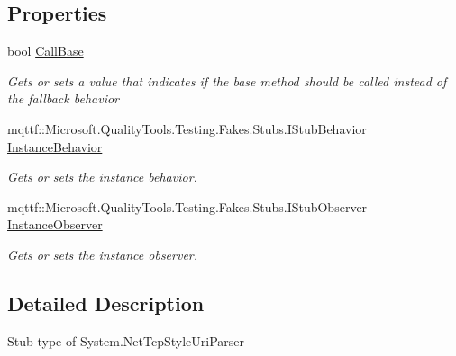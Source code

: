 \subsection*{Properties}
\begin{DoxyCompactItemize}
\item 
bool \hyperlink{class_system_1_1_fakes_1_1_stub_net_tcp_style_uri_parser_a2e34c6139d1ad583a8cffe35ad784e82}{Call\-Base}
\begin{DoxyCompactList}\small\item\em Gets or sets a value that indicates if the base method should be called instead of the fallback behavior\end{DoxyCompactList}\item 
mqttf\-::\-Microsoft.\-Quality\-Tools.\-Testing.\-Fakes.\-Stubs.\-I\-Stub\-Behavior \hyperlink{class_system_1_1_fakes_1_1_stub_net_tcp_style_uri_parser_aa1205385a9a0d88b396b0f5c817a42e8}{Instance\-Behavior}
\begin{DoxyCompactList}\small\item\em Gets or sets the instance behavior.\end{DoxyCompactList}\item 
mqttf\-::\-Microsoft.\-Quality\-Tools.\-Testing.\-Fakes.\-Stubs.\-I\-Stub\-Observer \hyperlink{class_system_1_1_fakes_1_1_stub_net_tcp_style_uri_parser_a6cc1740c6474710996c8c20bd59d3bf7}{Instance\-Observer}
\begin{DoxyCompactList}\small\item\em Gets or sets the instance observer.\end{DoxyCompactList}\end{DoxyCompactItemize}


\subsection{Detailed Description}
Stub type of System.\-Net\-Tcp\-Style\-Uri\-Parser



